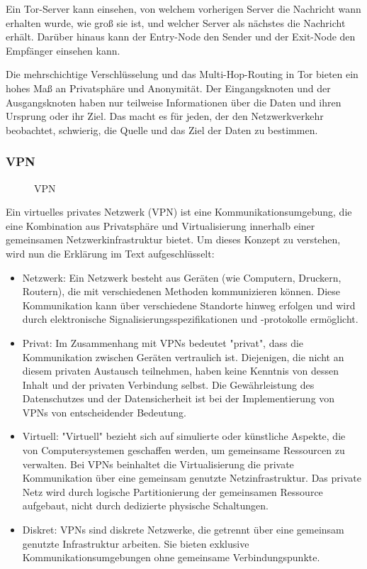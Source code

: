 Ein Tor-Server kann einsehen, von welchem vorherigen Server die Nachricht wann erhalten wurde, wie groß sie ist, und welcher Server als nächstes die Nachricht erhält. Darüber hinaus kann der Entry-Node den Sender und der Exit-Node den Empfänger einsehen kann.

Die mehrschichtige Verschlüsselung und das Multi-Hop-Routing in Tor bieten ein hohes Maß an Privatsphäre und Anonymität. Der Eingangsknoten und der Ausgangsknoten haben nur teilweise Informationen über die Daten und ihren Ursprung oder ihr Ziel. Das macht es für jeden, der den Netzwerkverkehr beobachtet, schwierig, die Quelle und das Ziel der Daten zu bestimmen\footnotemark{}.

\subsubsection{VPN}

\begin{figure}[h!]
    \centering
    
    \caption{VPN}
    \label{imgs:vpn}
\end{figure}

Ein virtuelles privates Netzwerk (VPN) ist eine Kommunikationsumgebung, die eine Kombination aus Privatsphäre und Virtualisierung innerhalb einer gemeinsamen Netzwerkinfrastruktur bietet. Um dieses Konzept zu verstehen, wird nun die Erklärung im Text aufgeschlüsselt:

\begin{itemize}

\item Netzwerk: Ein Netzwerk besteht aus Geräten (wie Computern, Druckern, Routern), die mit verschiedenen Methoden kommunizieren können. Diese Kommunikation kann über verschiedene Standorte hinweg erfolgen und wird durch elektronische Signalisierungsspezifikationen und -protokolle ermöglicht.

\item Privat: Im Zusammenhang mit VPNs bedeutet "privat", dass die Kommunikation zwischen Geräten vertraulich ist. Diejenigen, die nicht an diesem privaten Austausch teilnehmen, haben keine Kenntnis von dessen Inhalt und der privaten Verbindung selbst. Die Gewährleistung des Datenschutzes und der Datensicherheit ist bei der Implementierung von VPNs von entscheidender Bedeutung.

\item Virtuell: "Virtuell" bezieht sich auf simulierte oder künstliche Aspekte, die von Computersystemen geschaffen werden, um gemeinsame Ressourcen zu verwalten. Bei VPNs beinhaltet die Virtualisierung die private Kommunikation über eine gemeinsam genutzte Netzinfrastruktur. Das private Netz wird durch logische Partitionierung der gemeinsamen Ressource aufgebaut, nicht durch dedizierte physische Schaltungen.

\item Diskret: VPNs sind diskrete Netzwerke, die getrennt über eine gemeinsam genutzte Infrastruktur arbeiten. Sie bieten exklusive Kommunikationsumgebungen ohne gemeinsame Verbindungspunkte.

\end{itemize}

